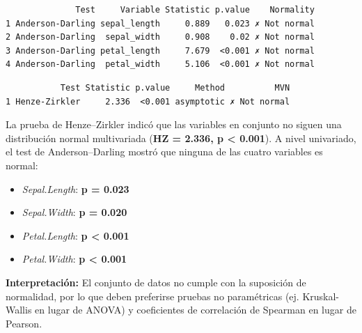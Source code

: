 \documentclass[
  spanish,
  11pt,
  a4paper,
  DIV=11,
  numbers=noendperiod]{scrartcl}
\newenvironment{Shaded}{\begin{snugshade}}{\end{snugshade}}
\newcommand{\AttributeTok}[1]{\textcolor[rgb]{0.40,0.45,0.13}{#1}}
\newcommand{\CommentTok}[1]{\textcolor[rgb]{0.37,0.37,0.37}{#1}}
\newcommand{\DecValTok}[1]{\textcolor[rgb]{0.68,0.00,0.00}{#1}}
\newcommand{\FunctionTok}[1]{\textcolor[rgb]{0.28,0.35,0.67}{#1}}
\newcommand{\NormalTok}[1]{\textcolor[rgb]{0.00,0.23,0.31}{#1}}
\newcommand{\OtherTok}[1]{\textcolor[rgb]{0.00,0.23,0.31}{#1}}
\newcommand{\SpecialCharTok}[1]{\textcolor[rgb]{0.37,0.37,0.37}{#1}}
\newcommand{\StringTok}[1]{\textcolor[rgb]{0.13,0.47,0.30}{#1}}
\begin{document}
\begin{Shaded}
\end{Shaded}

\begin{verbatim}
              Test     Variable Statistic p.value    Normality
1 Anderson-Darling sepal_length     0.889   0.023 ✗ Not normal
2 Anderson-Darling  sepal_width     0.908    0.02 ✗ Not normal
3 Anderson-Darling petal_length     7.679  <0.001 ✗ Not normal
4 Anderson-Darling  petal_width     5.106  <0.001 ✗ Not normal
\end{verbatim}

\begin{Shaded}
\end{Shaded}

\begin{verbatim}
           Test Statistic p.value     Method          MVN
1 Henze-Zirkler     2.336  <0.001 asymptotic ✗ Not normal
\end{verbatim}

La prueba de Henze--Zirkler indicó que las variables en conjunto no
siguen una distribución normal multivariada (\textbf{HZ = 2.336, p
\textless{} 0.001}). A nivel univariado, el test de Anderson--Darling
mostró que ninguna de las cuatro variables es normal:

\begin{itemize}
\item
  \emph{Sepal.Length}: \textbf{p = 0.023}
\item
  \emph{Sepal.Width}: \textbf{p = 0.020}
\item
  \emph{Petal.Length}: \textbf{p \textless{} 0.001}
\item
  \emph{Petal.Width}: \textbf{p \textless{} 0.001}
\end{itemize}

\textbf{Interpretación:} El conjunto de datos no cumple con la
suposición de normalidad, por lo que deben preferirse pruebas no
paramétricas (ej. Kruskal-Wallis en lugar de ANOVA) y coeficientes de
correlación de Spearman en lugar de Pearson.
\end{document}
